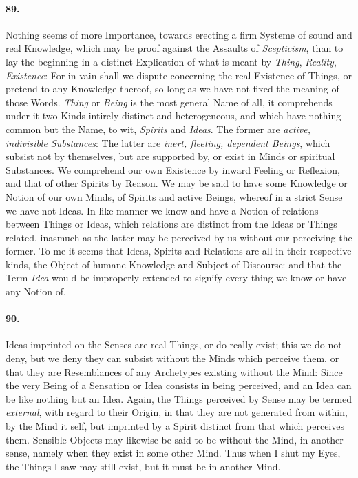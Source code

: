 \documentclass[]{article}
\newenvironment{sectionbody}{\begin{multicols}{2}}{\end{multicols}}
\begin{document}
\begin{sectionbody}
\paragraph{89.} Nothing seems of more Importance, towards erecting a firm Systeme
of sound and real Knowledge, which may be proof against the
Assaults of \emph{Scepticism}, than to lay the beginning in a
distinct Explication of what is meant by \emph{Thing},
\emph{Reality}, \emph{Existence}: For in vain shall we
dispute concerning the real Existence of Things, or pretend to
any Knowledge thereof, so long as we have not fixed the meaning
of those Words.  \emph{Thing} or \emph{Being} is the most
general Name of all, it comprehends under it two Kinds intirely
distinct and heterogeneous, and which have nothing common but the
Name, to wit, \emph{Spirits} and \emph{Ideas}.  The former
are \emph{active, indivisible Substances}: The latter are
\emph{inert, fleeting, dependent Beings}, which subsist not by
themselves, but are supported by, or exist in Minds or spiritual
Substances.  We comprehend our own Existence by inward Feeling or
Reflexion, and that of other Spirits by Reason.  We may be said
to have some Knowledge or Notion of our own Minds, of Spirits and
active Beings, whereof in a strict Sense we have not Ideas.  In
like manner we know and have a Notion of relations between Things
or Ideas, which relations are distinct from the Ideas or Things
related, inasmuch as the latter may be perceived by us without
our perceiving the former.  To me it seems that Ideas, Spirits
and Relations are all in their respective kinds, the Object of
humane Knowledge and Subject of Discourse: and that the Term
\emph{Idea} would be improperly extended to signify every thing
we know or have any Notion of.



\paragraph{90.} Ideas imprinted on the Senses are real Things, or do really
exist; this we do not deny, but we deny they can subsist without
the Minds which perceive them, or that they are Resemblances of
any Archetypes existing without the Mind: Since the very Being of
a Sensation or Idea consists in being perceived, and an Idea can
be like nothing but an Idea.  Again, the Things perceived by
Sense may be termed \emph{external}, with regard to their
Origin, in that they are not generated from within, by the Mind
it self, but imprinted by a Spirit distinct from that which
perceives them.  Sensible Objects may likewise be said to be
without the Mind, in another sense, namely when they exist in
some other Mind.  Thus when I shut my Eyes, the Things I saw may
still exist, but it must be in another Mind.




\end{sectionbody}
\end{document}

